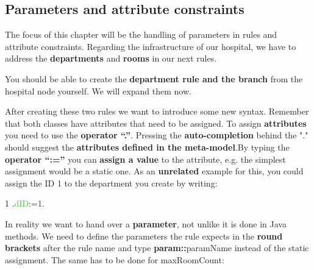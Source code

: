 \clearpage

\subsection{Parameters and attribute constraints}

The focus of this chapter will be the handling of parameters in rules and attribute constraints.
Regarding the infrastructure of our hospital, we have to address the \textbf{departments} and \textbf{rooms} in our next rules.\newline

You should be able to create the \textbf{department rule and the branch} from the hospital node yourself. We will expand them now.\newline

After creating these two rules we want to introduce some new syntax. Remember that both classes have attributes that need to be assigned. To assign \textbf{attributes} you need to use the \textbf{operator “.”}. Pressing the \textbf{auto-completion} behind the "." should suggest the \textbf{attributes defined in the meta-model}.\newline By typing the \textbf{operator “:=”} you can \textbf{assign a value} to the attribute, e.g. the simplest assignment would be a static one.\newline
As an \textbf{unrelated} example for this, you could assign the \textsf{ID 1} to the department you create by writing: \newline

1 \hspace{0.5cm} .\textcolor{LimeGreen}{dID}:=\textcolor{Purple}{1}. \newline

In reality we want to hand over a \textbf{parameter}, not unlike it is done in Java methods.\newline
We need to define the parameters the rule expects in the \textbf{round brackets} after the rule name and type \textbf{param::}\textsf{paramName} instead of the static assignment. The same has to be done for \textsf{maxRoomCount}:\newline\newline

